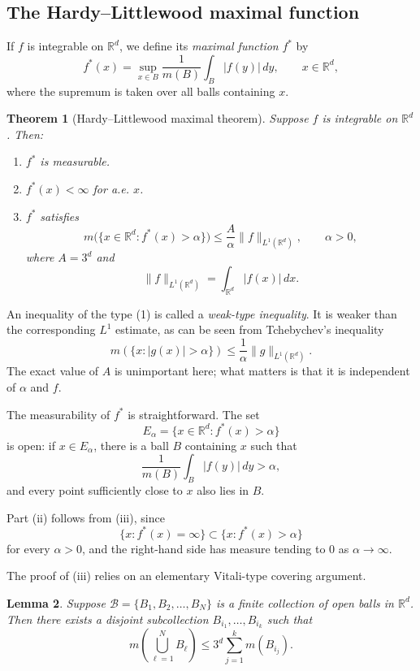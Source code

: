 \documentclass[11pt,openany]{book}
\newtheorem{theorem}{Theorem}[section]
\newtheorem{lemma}[theorem]{Lemma}
\begin{document}
\subsection{The Hardy--Littlewood maximal function}

If $f$ is integrable on $\mathbb R^d$, we define its \emph{maximal function} $f^*$ by
\[
f^*(x)=\sup_{x\in B}\frac1{m(B)}\int_B|f(y)|\,dy,
\qquad x\in\mathbb R^d,
\]
where the supremum is taken over all balls containing $x$.

\begin{theorem}[Hardy--Littlewood maximal theorem]
Suppose $f$ is integrable on $\mathbb R^d$. Then:
\begin{enumerate}
\item[(i)] $f^*$ is measurable.
\item[(ii)] $f^*(x)<\infty$ for a.e. $x$.
\item[(iii)] $f^*$ satisfies
\begin{equation}
 m\bigl(\{x\in\mathbb R^d:f^*(x)>\alpha\}\bigr)
 \le \frac{A}{\alpha}\|f\|_{L^1(\mathbb R^d)},
 \qquad \alpha>0,
 \tag{1}
\end{equation}
where $A=3^d$ and
\[
\|f\|_{L^1(\mathbb R^d)}=\int_{\mathbb R^d}|f(x)|\,dx.
\]
\end{enumerate}
\end{theorem}

An inequality of the type (1) is called a \emph{weak-type inequality}. It is weaker than the corresponding $L^1$ estimate, as can be seen from Tchebychev's inequality
\[
m(\{x:|g(x)|>\alpha\})\le \frac1\alpha\|g\|_{L^1(\mathbb R^d)}.
\]
The exact value of $A$ is unimportant here; what matters is that it is independent of $\alpha$ and $f$.

The measurability of $f^*$ is straightforward. The set
\[
E_\alpha=\{x\in\mathbb R^d:f^*(x)>\alpha\}
\]
is open: if $x\in E_\alpha$, there is a ball $B$ containing $x$ such that
\[
\frac1{m(B)}\int_B|f(y)|\,dy>\alpha,
\]
and every point sufficiently close to $x$ also lies in $B$.

Part (ii) follows from (iii), since
\[
\{x:f^*(x)=\infty\}\subset\{x:f^*(x)>\alpha\}
\]
for every $\alpha>0$, and the right-hand side has measure tending to $0$ as $\alpha\to\infty$.

The proof of (iii) relies on an elementary Vitali-type covering argument.

\begin{lemma}
Suppose $\mathcal B=\{B_1,B_2,\ldots,B_N\}$ is a finite collection of open balls in $\mathbb R^d$. Then there exists a disjoint subcollection
$B_{i_1},\ldots,B_{i_k}$ such that
\[
m\left(\bigcup_{\ell=1}^N B_\ell\right)
\le 3^d\sum_{j=1}^k m(B_{i_j}).
\]
\end{lemma}
\end{document}
